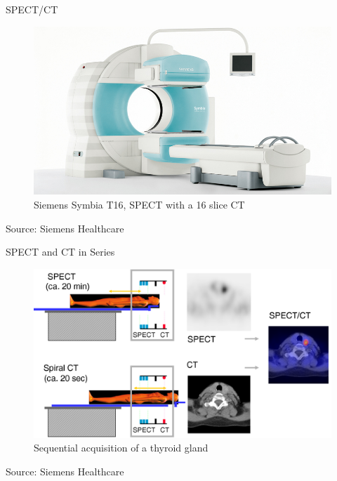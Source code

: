 
\begin{frame}{SPECT/CT}
    \begin{figure}
        \centering
        \includegraphics[height=0.8\textheight]{images/spect_ct}
        \caption{Siemens Symbia T16, SPECT with a 16 slice CT}%
    \end{figure}
    \flushright
    \vspace{-0.5cm}
    \tiny Source: Siemens Healthcare
\end{frame}


\begin{frame}{SPECT and CT in Series}
    \begin{figure}
        \centering
        \includegraphics[height=0.8\textheight]{images/spect_ct_diagram}
        \caption{\scriptsize Sequential acquisition of a thyroid gland}%
    \end{figure}
    \flushright
    \vspace{-0.5cm}
    \tiny Source: Siemens Healthcare
\end{frame}

